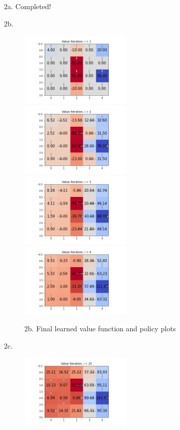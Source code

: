 \documentclass[submit]{harvardml}
\begin{document}
\begin{itemize}
    \item[2a.] Completed!
    \item[2b.] 
        \begin{figure}[h!]
        \includegraphics[width=0.5\textwidth]{HW6/Value_1.png}
        \includegraphics[width=0.5\textwidth]{HW6/Value_2.png}
        \includegraphics[width=0.5\textwidth]{HW6/Value_3.png}
        \includegraphics[width=0.5\textwidth]{HW6/Value_4.png}
        \caption{2b. Final learned value function and policy plots}
    \end{figure}
    \item[2c.]
    \begin{figure}[h!]
        \includegraphics[width=0.5\textwidth]{HW6/Value_25.png}

\end{figure}
\end{itemize}
\end{document}
